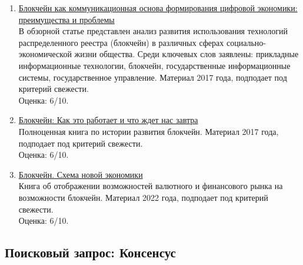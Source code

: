 \documentclass[a4paper, 12pt]{report}		%
\begin{document}
\begin{enumerate}
\item \href{https://cyberleninka.ru/article/n/blokcheyn-kak-kommunikatsionnaya-osnova-formirovaniya-tsifrovoy-ekonomiki-preimuschestva-i-problemy}{Блокчейн как коммуникационная основа формирования цифровой экономики: преимущества и проблемы}\\
В обзорной статье представлен анализ развития использования технологий распределенного реестра (блокчейн) в различных сферах социально-экономической жизни общества. Среди ключевых слов заявлены: прикладные информационные технологии, блокчейн, государственные информационные системы, государственное управление. Материал 2017 года, подподает под критерий свежести.\\
Оценка: 6/10.
\item \href{https://books.google.ru/books?hl=en&lr=&id=sP9CDwAAQBAJ&oi=fnd&pg=PT2&dq=%D0%B1%D0%BB%D0%BE%D0%BA%D1%87%D0%B5%D0%B9%D0%BD&ots=LGrkyFIDm_&sig=vSRGShqVEHSKbplbfM9LnVQWCeA&redir_esc=y#v=onepage&q=%D0%B1%D0%BB%D0%BE%D0%BA%D1%87%D0%B5%D0%B9%D0%BD&f=false}{Блокчейн: Как это работает и что ждет нас завтра}\\
Полноценная книга по истории развития блокчейн. Материал 2017 года, подподает под критерий свежести.\\
Оценка: 6/10.
\item \href{https://books.google.ru/books?hl=en&lr=&id=5peUDwAAQBAJ&oi=fnd&pg=PT3&dq=%D0%B1%D0%BB%D0%BE%D0%BA%D1%87%D0%B5%D0%B9%D0%BD&ots=pDls9WbrfK&sig=LvwOfXUGtqzJQScVAYn0YZqrNYQ&redir_esc=y#v=onepage&q=%D0%B1%D0%BB%D0%BE%D0%BA%D1%87%D0%B5%D0%B9%D0%BD&f=false}{Блокчейн. Схема новой экономики}\\
Книга об отображении возможностей валютного и финансового рынка на возможности блокчейн. Материал 2022 года, подподает под критерий свежести.\\
Оценка: 6/10.
\end{enumerate}

\subsection*{Поисковый запрос: Консенсус}
\end{document}

